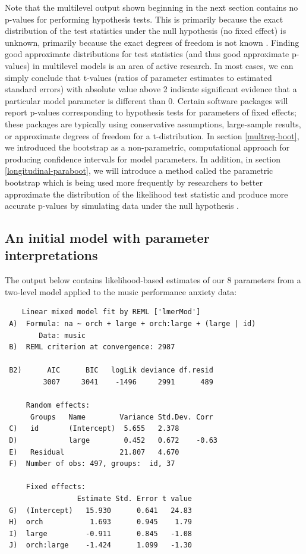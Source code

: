 \documentclass[
]{krantz}
\begin{document}
Note that the multilevel output shown beginning in the next section contains no p-values for performing hypothesis tests. This is primarily because the exact distribution of the test statistics under the null hypothesis (no fixed effect) is unknown, primarily because the exact degrees of freedom is not known \citep{Bates2015}. Finding good approximate distributions for test statistics (and thus good approximate p-values) in multilevel models is an area of active research. In most cases, we can simply conclude that t-values (ratios of parameter estimates to estimated standard errors) with absolute value above 2 indicate significant evidence that a particular model parameter is different than 0. Certain software packages will report p-values corresponding to hypothesis tests for parameters of fixed effects; these packages are typically using conservative assumptions, large-sample results, or approximate degrees of freedom for a t-distribution. In section \ref{multreg-boot}, we introduced the bootstrap as a non-parametric, computational approach for producing confidence intervals for model parameters. In addition, in section \ref{longitudinal-paraboot}, we will introduce a method called the parametric bootstrap which is being used more frequently by researchers to better approximate the distribution of the likelihood test statistic and produce more accurate p-values by simulating data under the null hypothesis \citep{Efron2012}.

\hypertarget{initialmodel}{%
\subsection{An initial model with parameter interpretations}\label{initialmodel}}

The output below contains likelihood-based estimates of our 8 parameters from a two-level model applied to the music performance anxiety data:

\begin{verbatim}
    Linear mixed model fit by REML ['lmerMod'] 
 A)  Formula: na ~ orch + large + orch:large + (large | id) 
        Data: music 
 B)  REML criterion at convergence: 2987 
      
 B2)      AIC      BIC   logLik deviance df.resid  
         3007     3041    -1496     2991      489  
      
     Random effects: 
      Groups   Name        Variance Std.Dev. Corr  
 C)   id       (Intercept)  5.655   2.378          
 D)            large        0.452   0.672    -0.63 
 E)   Residual             21.807   4.670          
 F)  Number of obs: 497, groups:  id, 37 
      
     Fixed effects: 
                 Estimate Std. Error t value 
 G)  (Intercept)   15.930      0.641   24.83 
 H)  orch           1.693      0.945    1.79 
 I)  large         -0.911      0.845   -1.08 
 J)  orch:large    -1.424      1.099   -1.30
\end{verbatim}
\end{document}
